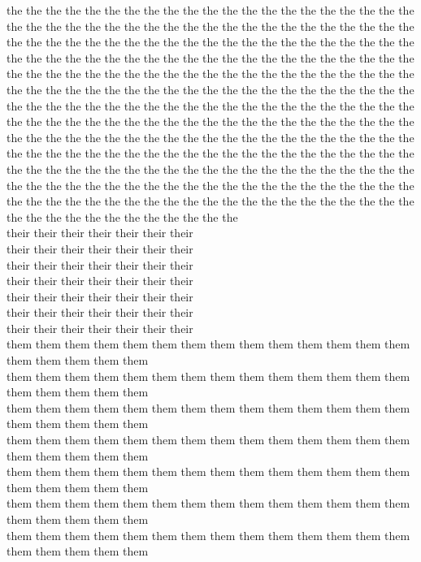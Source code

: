 the the the the the the the the the the the the the the the the the the the the the the the the the the the the the the the the the the the the the the the the the the the the the the the the the the the the the the the the the the the the the the the the the the the the the the the the the the the the the the the the the the the the the the the the the the the the the the the the the the the the the the the the the the the the the the the the the the the the the the the the the the the the the the the the the the the the the the the the the the the the the the the the the the the the the the the the the the the the the the the the the the the the the the the the the the the the the the the the the the the the the the the the the the the the the the the the the the the the the the the the the the the the the the the the the the the the the the the the the the the the the the the the the the the the the the the the the the the the the the the the the the the the the the the the the the the the the the the the the the the the the the the the the the the the the the the the the the the the the the the the the the the the the\\
their their their their their their their\\
their their their their their their their\\
their their their their their their their\\
their their their their their their their\\
their their their their their their their\\
their their their their their their their\\
their their their their their their their\\
them them them them them them them them them them them them them them them them them them them\\
them them them them them them them them them them them them them them them them them them them\\
them them them them them them them them them them them them them them them them them them them\\
them them them them them them them them them them them them them them them them them them them\\
them them them them them them them them them them them them them them them them them them them\\
them them them them them them them them them them them them them them them them them them them\\
them them them them them them them them them them them them them them them them them them them\\
